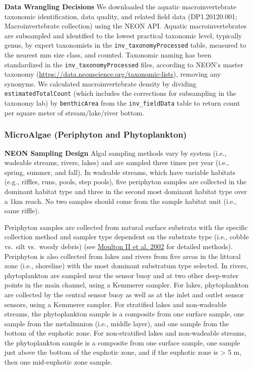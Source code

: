 \documentclass[
  12pt,
]{article}
\begin{document}
\textbf{Data Wrangling Decisions} We downloaded the aquatic macroinvertebrate taxonomic identification, data quality, and related field data (DP1.20120.001; Macroinvertebrate collection) using the NEON API. Aquatic macroinvertebrates are subsampled and identified to the lowest practical taxonomic level, typically genus, by expert taxonomists in the \texttt{inv\_taxonomyProcessed} table, measured to the nearest mm size class, and counted. Taxonomic naming has been standardized in the \texttt{inv\_taxonomyProcessed} files, according to NEON's master taxonomy (\url{https://data.neonscience.org/taxonomic-lists}), removing any synonyms. We calculated macroinvertebrate density by dividing \texttt{estimatedTotalCount} (which includes the corrections for subsampling in the taxonomy lab) by \texttt{benthicArea} from the \texttt{inv\_fieldData} table to return count per square meter of stream/lake/river bottom.

\hypertarget{microalgae-periphyton-and-phytoplankton}{%
\subsubsection{MicroAlgae (Periphyton and Phytoplankton)}\label{microalgae-periphyton-and-phytoplankton}}

\textbf{NEON Sampling Design} Algal sampling methods vary by system (i.e., wadeable streams, rivers, lakes) and are sampled three times per year (i.e., spring, summer, and fall). In wadeable streams, which have variable habitats (e.g., riffles, runs, pools, step pools), five periphyton samples are collected in the dominant habitat type and three in the second most dominant habitat type over a 1km reach. No two samples should come from the sample habitat unit (i.e., same riffle).

Periphyton samples are collected from natural surface substrata with the specific collection method and sampler type dependent on the substrate type (i.e., cobble vs.~silt vs.~woody debris) (see \protect\hyperlink{ref-moulton2002revised}{Moulton II et al. 2002} for detailed methods). Periphyton is also collected from lakes and rivers from five areas in the littoral zone (i.e., shoreline) with the most dominant substratum type selected. In rivers, phytoplankton are sampled near the sensor buoy and at two other deep-water points in the main channel, using a Kemmerer sampler. For lakes, phytoplankton are collected by the central sensor buoy as well as at the inlet and outlet sensor sensors, using a Kemmerer sampler. For stratified lakes and non-wadeable streams, the phytoplankton sample is a composite from one surface sample, one sample from the metalimnion (i.e., middle layer), and one sample from the bottom of the euphotic zone. For non-stratified lakes and non-wadeable streams, the phytoplankton sample is a composite from one surface sample, one sample just above the bottom of the euphotic zone, and if the euphotic zone is \textgreater{} 5 m, then one mid-euphotic zone sample.
\end{document}
